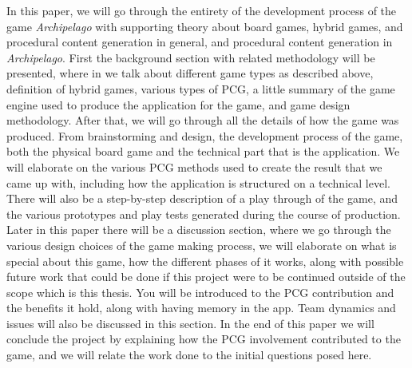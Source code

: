 In this paper, we will go through the entirety of the development process of the game \textit{Archipelago} with supporting theory about board games, hybrid games, and procedural content generation in general, and procedural content generation in \textit{Archipelago}. First the background section with related methodology will be presented, where in we talk about different game types as described above, definition of hybrid games, various types of PCG, a little summary of the game engine used to produce the application for the game, and game design methodology.
After that, we will go through all the details of how the game was produced. From brainstorming and design, the development process of the game, both the physical board game and the technical part that is the application. We will elaborate on the various PCG methods used to create the result that we came up with, including how the application is structured on a technical level. There will also be a step-by-step description of a play through of the game, and the various prototypes and play tests generated during the course of production.
Later in this paper there will be a discussion section, where we go through the various design choices of the game making process, we will elaborate on what is special about this game, how the different phases of it works, along with possible future work that could be done if this project were to be continued outside of the scope which is this thesis. You will be introduced to the PCG contribution and the benefits it hold, along with having memory in the app. Team dynamics and issues will also be discussed in this section.
In the end of this paper we will conclude the project by explaining how the PCG involvement contributed to the game, and we will relate the work done to the initial questions posed here.